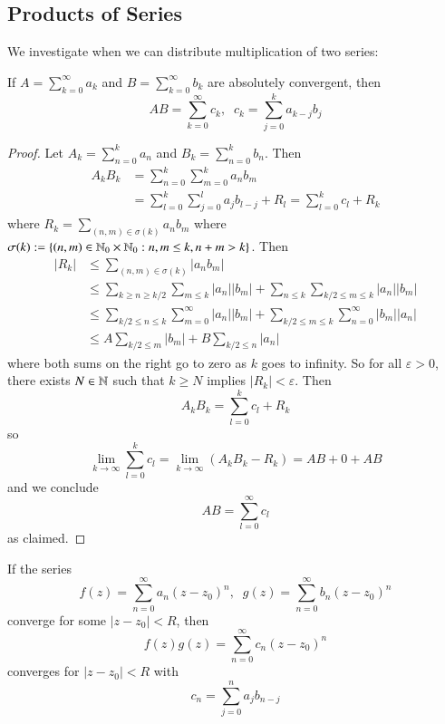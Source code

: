 \subsection{Products of Series}

We investigate when we can distribute multiplication of two series:

\begin{prop}\label{prop:3.3.4}
    If $A = \sum_{k=0}^{\infty}a_k$ and $B = \sum_{k=0}^{\infty}b_k$ are absolutely convergent, then \begin{equation*}
        AB = \sum_{k=0}^{\infty}c_k,\;\;c_k = \sum_{j=0}^ka_{k-j}b_j
    \end{equation*}
\end{prop}
\begin{proof}
    Let $A_k = \sum_{n=0}^ka_n$ and $B_k = \sum_{n=0}^kb_n$. Then \begin{align*}
        A_kB_k &= \sum_{n=0}^k\sum_{m=0}^ka_nb_m \\
        &= \sum_{l=0}^k\sum_{j=0}^la_jb_{l-j} + R_l = \sum_{l=0}^kc_l+R_k
    \end{align*}
    where $R_k = \sum_{(n,m) \in \sigma(k)}a_nb_m$ where $\sigma(k) := \{(n,m) \in \mathbb N_0\times \mathbb N_0:n,m\leq k,n+m > k\}$. Then \begin{align*}
        |R_k| &\leq \sum_{(n,m) \in \sigma(k)}|a_nb_m| \\
        &\leq \sum_{k\geq n\geq k/2}\sum_{m\leq k}|a_n||b_m| + \sum_{n\leq k}\sum_{k/2\leq m\leq k}|a_n||b_m| \\
        &\leq \sum_{k/2\leq n \leq k}\sum_{m=0}^{\infty}|a_n||b_m| + \sum_{k/2\leq m\leq k}\sum_{n=0}^{\infty}|b_m||a_n| \\
        &\leq A \sum_{k/2\leq m}|b_m| + B\sum_{k/2\leq n}|a_n|
    \end{align*}
    where both sums on the right go to zero as $k$ goes to infinity. So for all $\varepsilon > 0$, there exists $N \in \mathbb N$ such that $k \geq N$ implies $|R_k| < \varepsilon$. Then $$A_kB_k = \sum_{l=0}^kc_l+R_k$$ so $$\lim\limits_{k\rightarrow \infty}\sum_{l=0}^kc_l = \lim\limits_{k\rightarrow \infty}(A_kB_k-R_k) = AB+0 + AB$$ and we conclude $$AB = \sum_{l=0}^{\infty}c_l$$ as claimed.
\end{proof}

\begin{cor}
    If the series $$f(z) = \sum_{n=0}^{\infty}a_n(z-z_0)^n,\;\;g(z) = \sum_{n=0}^{\infty}b_n(z-z_0)^n$$ converge for some $|z-z_0| < R$, then $$f(z)g(z) = \sum_{n=0}^{\infty}c_n(z-z_0)^n$$ converges for $|z-z_0| < R$ with $$c_n = \sum_{j=0}^na_jb_{n-j}$$
\end{cor}

